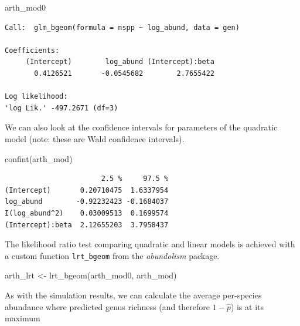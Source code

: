 \documentclass[
  letterpaper,
  DIV=11,
  numbers=noendperiod]{scrartcl}
\newenvironment{Shaded}{\begin{snugshade}}{\end{snugshade}}
\newcommand{\FunctionTok}[1]{\textcolor[rgb]{0.28,0.35,0.67}{#1}}
\newcommand{\NormalTok}[1]{\textcolor[rgb]{0.00,0.23,0.31}{#1}}
\newcommand{\OtherTok}[1]{\textcolor[rgb]{0.00,0.23,0.31}{#1}}
\begin{document}
\begin{Shaded}
\begin{Highlighting}[]
\NormalTok{arth\_mod0}
\end{Highlighting}
\end{Shaded}

\begin{verbatim}
Call:  glm_bgeom(formula = nspp ~ log_abund, data = gen)

Coefficients: 
     (Intercept)        log_abund (Intercept):beta 
       0.4126521       -0.0545682        2.7655422 

Log likelihood: 
'log Lik.' -497.2671 (df=3)
\end{verbatim}

We can also look at the confidence intervals for parameters of the
quadratic model (note: these are Wald confidence intervals).

\begin{Shaded}
\begin{Highlighting}[]
\FunctionTok{confint}\NormalTok{(arth\_mod)}
\end{Highlighting}
\end{Shaded}

\begin{verbatim}
                       2.5 %     97.5 %
(Intercept)       0.20710475  1.6337954
log_abund        -0.92232423 -0.1684037
I(log_abund^2)    0.03009513  0.1699574
(Intercept):beta  2.12655203  3.7958437
\end{verbatim}

The likelihood ratio test comparing quadratic and linear models is
achieved with a custom function \texttt{lrt\_bgeom} from the
\emph{abundolism} package.

\begin{Shaded}
\begin{Highlighting}[]
\NormalTok{arth\_lrt }\OtherTok{\textless{}{-}} \FunctionTok{lrt\_bgeom}\NormalTok{(arth\_mod0, arth\_mod)}
\end{Highlighting}
\end{Shaded}

As with the simulation results, we can calculate the average per-species
abundance where predicted genus richness (and therefore \(1 - \hat{p}\))
is at its maximum
\end{document}

